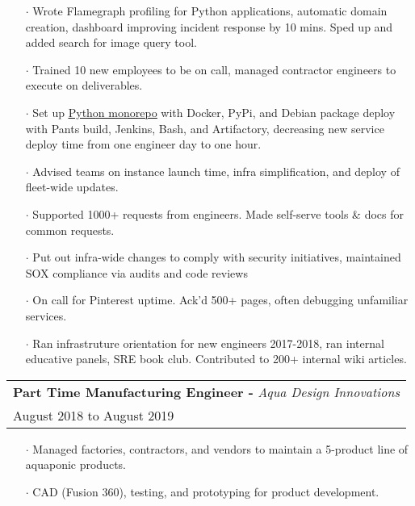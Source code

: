 \documentclass[letterpaper, oneside, final]{scrartcl} %
\begin{document}
\begin{center}
\begin{itemize}
\item[$\cdot$] Wrote Flamegraph profiling for Python applications, automatic domain creation, dashboard improving incident response by 10 mins. Sped up and added search for image query tool.\\[10pt]
\item[$\cdot$] Trained 10 new employees to be on call, managed contractor engineers to execute on deliverables.\\[10pt]
\item[$\cdot$] Set up \underline{\href{https://medium.com/pinterest-engineering/building-a-python-monorepo-for-fast-reliable-development-be763781f67}{Python monorepo}} with Docker, PyPi, and Debian package deploy with Pants build, Jenkins, Bash, and Artifactory, decreasing new service deploy time from one engineer day to one hour.\\[10pt]
\item[$\cdot$] Advised teams on instance launch time, infra simplification, and deploy of fleet-wide updates.\\[10pt]
\item[$\cdot$] Supported 1000+ requests from engineers. Made self-serve tools \& docs for common requests.\\[10pt]
\item[$\cdot$] Put out infra-wide changes to comply with security initiatives, maintained SOX compliance via audits and code reviews\\[10pt]
\item[$\cdot$] On call for Pinterest uptime. Ack'd 500+ pages, often debugging unfamiliar services.\\[10pt]
\item[$\cdot$] Ran infrastruture orientation for new engineers 2017-2018, ran internal educative panels, SRE book club. Contributed to 200+ internal wiki articles.\\[10pt]

\end{itemize}

\begingroup\setlength{\fboxsep}{0pt}
\colorbox{mygray}{
\begin{flushleft}
\begin{tabularx}{\textwidth}{l}
\textbf{Part Time Manufacturing Engineer -} \textit{Aqua Design Innovations}\\
August 2018 to August 2019\\
\end{tabularx}
\end{flushleft}
}\endgroup
\vspace{-0.1cm}
\begin{itemize} \itemsep-0.2cm
\item[$\cdot$] Managed factories, contractors, and vendors to maintain a 5-product line of aquaponic products. \\
\item[$\cdot$] CAD (Fusion 360), testing, and prototyping for product development.\\
\end{itemize}


\end{center}
\end{document}
